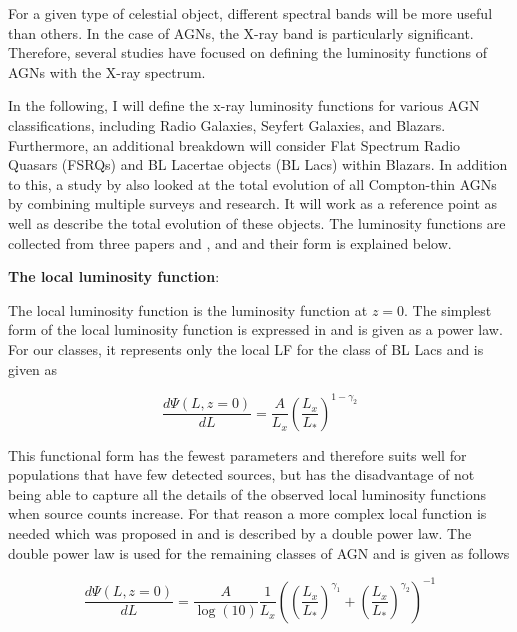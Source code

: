 \documentclass{article}
\begin{document}

For a given type of celestial object, different spectral bands will be more useful than others. In the case of AGNs, 
the X-ray band is particularly significant. Therefore, several studies have focused on defining the luminosity functions of AGNs with the X-ray spectrum.

In the following, I will define the x-ray luminosity functions for various AGN classifications, including Radio Galaxies, Seyfert Galaxies, and Blazars. Furthermore, an additional breakdown will consider Flat Spectrum Radio Quasars (FSRQs) and BL Lacertae objects (BL Lacs) within Blazars.  In addition to this, 
a study by \cite{Ueda_2014} also looked at the total evolution of all Compton-thin AGNs by combining multiple surveys and research.  It will work as a reference point as well as describe the total evolution of these objects. The luminosity functions are collected from three papers \cite{Ajello_2009} and \cite{Silverman_2008}, and \cite{Ueda_2014} and their form is explained below.

\textbf{The local luminosity function}:

The local luminosity function is the luminosity function at $z=0$.
The simplest form of the local luminosity function is expressed in \cite{Ajello_2009} and is given as a power law. For our classes, it represents only the local LF for the class of BL Lacs 
and is given as

\begin{equation}
    \frac{d\Psi(L,z=0)}{dL} = \frac{A}{L_x} \left( \frac{L_x}{L_*}\right)^{1-\gamma_2}
\end{equation}

This functional form has the fewest parameters and therefore suits well for populations that have few detected sources, but has the disadvantage of not being able to capture all the details of the observed local luminosity functions when source counts increase.
For that reason a more complex local function is needed which was proposed in \cite{Ueda_2003} and is described by a double power law.
The double power law is used for the remaining classes of AGN and is given as follows


   
\begin{equation}
    \frac{d\Psi(L,z=0)}{dL} =  \frac{A}{\log(10)} \frac{1}{L_x} \left( \left( \frac{L_x}{L_*} \right)^{\gamma_1} + \left( \frac{L_x}{L_*} \right)^{\gamma_2} \right)^{-1}
\end{equation}
\end{document}
